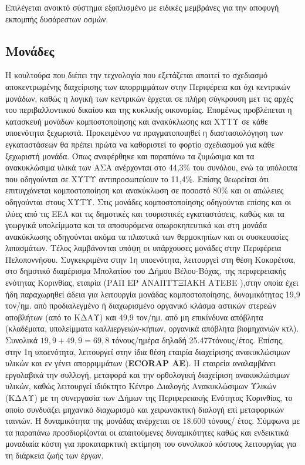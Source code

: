 \documentclass[12pt]{article}
\newcommand{\gr}{\selectlanguage{greek}}
\newcommand{\eng}{\selectlanguage{english}}
\begin{document}
 	Επιλέγεται ανοικτό σύστημα εξοπλισμένο με ειδικές μεμβράνες για την αποφυγή εκπομπής δυσάρεστων οσμών.
 	
 	\subsection{Μονάδες}
 	
 	Η κουλτούρα που διέπει την τεχνολογία που εξετάζεται απαιτεί το σχεδιασμό αποκεντρωμένης διαχείρισης των απορριμμάτων στην Περιφέρεια και όχι κεντρικών μονάδων, καθώς η λογική των κεντρικών έρχεται σε πλήρη σύγκρουση μετ τις αρχές του περιβαλλοντικού δικαίου και της κυκλικής οικονομίας. Επομένως προβλέπεται η κατασκευή μονάδων κομποστοποίησης και ανακύκλωσης και ΧΥΤΥ σε κάθε υποενότητα ξεχωριστά. Προκειμένου να πραγματοποιηθεί η διαστασιολόγηση των εγκαταστάσεων θα πρέπει πρώτα να καθοριστεί το φορτίο σχεδιασμού για κάθε ξεχωριστή μονάδα. Όπως αναφέρθηκε και παραπάνω τα ζυμώσιμα και τα ανακυκλώσιμα υλικά των ΑΣΑ ανέρχονται στο 44,3\% του συνόλου, ενώ τα υπόλοιπα που οδηγούνται σε ΧΥΤΥ αντιπροσωπεύουν το 11,4\%. Επίσης θεωρείται ότι επιτυγχάνεται κομποστοποίηση και ανακύκλωση σε ποσοστό 80\% και οι απώλειες οδηγούνται στους ΧΥΤΥ. Στις μονάδες κομποστοποίησης οδηγούνται επίσης και οι ιλύες από τις ΕΕΛ και τις δημοτικές και τουριστικές εγκαταστάσεις, καθώς και τα γεωργικά υπολείμματα και τα αποσυρόμενα οπωροκηπευτικά και στη μονάδα ανακύκλωσης οδηγούνται ακόμα τα πλαστικά των θερμοκηπίων και οι συσκευασίες λιπασμάτων. Τέλος λαμβάνονται υπόψη οι υπάρχουσες μονάδες στην Περιφέρεια Πελοποννήσου. Συγκεκριμένα στην 1η υποενότητα, λειτουργεί στη θέση Κοκορέτσα, στο δημοτικό διαμέρισμα Μπολατίου του Δήμου Βέλου-Βόχας, της περιφερειακής ενότητας Κορινθίας, εταιρία (ΡΑΠ ΕΡ ΑΝΑΠΤΥΞΙΑΚΗ ΑΤΕΒΕ ),στην οποία έχει ήδη παραχωρηθεί άδεια για λειτουργία μονάδας κομποστοποίησης, δυναμικότητας 19,9 τον/ημ. από προδιαλεγμένο ή διαχωρισμένο οργανικό κλάσμα αστικών στερεών αποβλήτων (από το ΚΔΑΥ) και 49,9 τον/ημ. από μη επικίνδυνα απόβλητα (κλαδέματα, υπολείμματα καλλιεργειών-κήπων, οργανικά απόβλητα βιομηχανιών κτλ). Συνολικά $19,9+49,9=69,8$ τόνους/ημέρα δηλαδή 25.477τόνους/έτος. Επίσης, στην 1η υποενότητα, λειτουργεί στην ίδια θέση εταιρία διαχείρισης ανακυκλώσιμων υλικών  και εν γένει απορριμμάτων (\textbf{\eng ECORAP \gr AE}). Η εταιρεία αναλαμβάνει εργολαβικά την συλλογή, μεταφορά και την ορθολογική διαχείριση ανακυκλώσιμων υλικών, καθώς λειτουργεί ιδιόκτητο Κέντρο Διαλογής Ανακυκλώσιμων Υλικών (ΚΔΑΥ) με τη συνεργασία των Δήμων της Περιφερειακής Ενότητας Κορινθίας, το οποίο συνδυάζει μηχανικό διαχωρισμό και χειρωνακτική διαλογή επί μεταφορικών ταινιών. Η δυναμικότητα της μονάδας ανέρχεται σε 18.600 τόνους/ έτος. Σύμφωνα με τα παραπάνω προσδιορίζονται οι απαιτούμενες δυναμικότητες καθώς και ενδεικτικά μοναδιαία κόστη για προκαταρκτική εκτίμηση του συνολικού κόστους λειτουργίας για τη διάρκεια ζωής των έργων. 
 	
\end{document}
